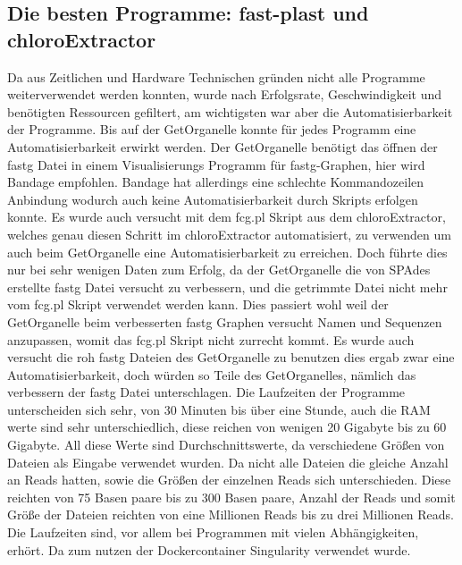 \documentclass{scrartcl}
\begin{document}
\subsection{Die besten Programme: fast-plast und chloroExtractor}
\label{sec-3-5}
Da aus Zeitlichen und Hardware Technischen gründen nicht alle Programme weiterverwendet werden konnten, wurde nach Erfolgsrate, Geschwindigkeit und benötigten Ressourcen
gefiltert, am wichtigsten war aber die Automatisierbarkeit der Programme. Bis auf der GetOrganelle konnte für jedes Programm eine Automatisierbarkeit
erwirkt werden. Der GetOrganelle benötigt das öffnen der fastg Datei in einem Visualisierungs Programm für fastg-Graphen, hier wird Bandage empfohlen.
Bandage hat allerdings eine schlechte Kommandozeilen Anbindung wodurch auch keine Automatisierbarkeit durch Skripts erfolgen konnte.
Es wurde auch versucht mit dem fcg.pl Skript aus dem chloroExtractor, welches genau diesen Schritt im chloroExtractor automatisiert, zu verwenden um auch beim
GetOrganelle eine Automatisierbarkeit zu erreichen. Doch führte dies nur bei sehr wenigen Daten zum Erfolg, da der GetOrganelle die von SPAdes erstellte 
fastg Datei versucht zu verbessern, und die getrimmte Datei nicht mehr vom fcg.pl Skript verwendet werden kann. Dies passiert wohl weil der GetOrganelle beim verbesserten
fastg Graphen versucht Namen und Sequenzen anzupassen, womit das fcg.pl Skript nicht zurrecht kommt. Es wurde auch versucht die roh fastg Dateien des GetOrganelle zu benutzen
dies ergab zwar eine Automatisierbarkeit, doch würden so Teile des GetOrganelles, nämlich das verbessern der fastg Datei unterschlagen.
Die Laufzeiten der Programme unterscheiden sich sehr, von 30 Minuten bis über eine Stunde, auch die RAM werte sind sehr unterschiedlich, diese
reichen von wenigen 20 Gigabyte bis zu 60 Gigabyte. All diese Werte sind Durchschnittswerte, da verschiedene Größen von Dateien als Eingabe verwendet wurden. Da nicht alle
Dateien die gleiche Anzahl an Reads hatten, sowie die Größen der einzelnen Reads sich unterschieden. Diese reichten von 75 Basen paare bis zu 300 Basen paare, Anzahl der Reads
und somit Größe der Dateien reichten von eine Millionen Reads bis zu drei Millionen Reads. Die Laufzeiten sind, vor allem bei Programmen mit vielen Abhängigkeiten, erhört. Da zum nutzen
der Dockercontainer Singularity \footnotemark[40]{} verwendet wurde.    
\end{document}
